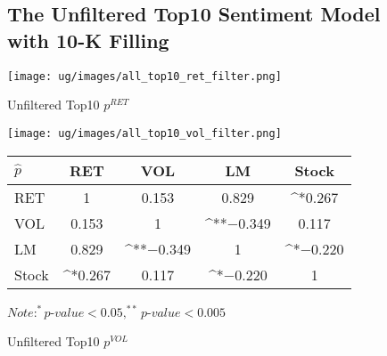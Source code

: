 \documentclass[logo,bsc,singlespacing,parskip]{infthesis}
\begin{document}
\begin{figure}[ht]
\subsection{The Unfiltered Top10 Sentiment Model with 10-K Filling}
\label{appendix_all_top10}
\begin{minipage}{0.90\textwidth}
  \centering
  \begin{minipage}{0.5\textwidth}
    \centering
    \texttt{[image: ug/images/all\_top10\_ret\_filter.png]}
    \caption{\small Unfiltered Top10 ${p}^{RET}$}
    \label{fig:all_top10_ret_unfiltered}
  \end{minipage}%
  \begin{minipage}{0.5\textwidth}
    \centering
    \texttt{[image: ug/images/all\_top10\_vol\_filter.png]} 
    \caption{\small Unfiltered Top10 ${p}^{VOL}$}
    \label{fig:all_top10_vol_unfiltered}
  \end{minipage}


    \begin{minipage}[t]{0.9\textwidth}
    \centering
    \begin{tabular}{lcccc}
    \label{tab:all_top10_corr_unfiltered}
    $\hat{p}$      & RET       & VOL       & LM        & Stock    \\ \hline
    RET    & 1  & 0.153  & 0.829 & ^{*}0.267 \\
    VOL    & 0.153   & 1  & ^{**}$-$0.349 & 0.117  \\
    LM    & 0.829 & ^{**}$-$0.349 & 1  & ^{*}$-$0.220 \\
    Stock  & ^{*}0.267 & 0.117  & ^{*}$-$0.220 & 1  \\ \hline
    \end{tabular}
    \medskip
    $\textit{Note}: ^{*}p$-$value<0.05, ^{**}p$-$value<0.005$
    \end{minipage}
    
\end{minipage}
\end{figure}
\end{document}
